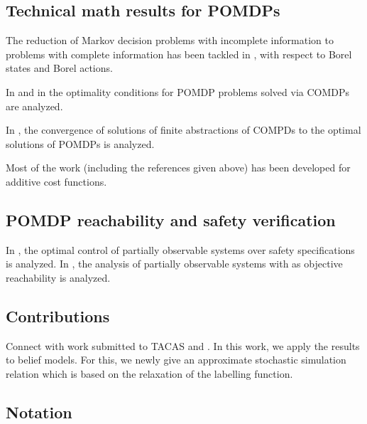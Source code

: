 \documentclass{ifacconf}
\newcommand{\red}[1]{{\color{red} #1}}
\begin{document}
\subsection{Technical math results for POMDPs}
The reduction of Markov decision problems with incomplete information to problems with complete information has been tackled in
\cite{yushkevich_reduction_1976,rhenius_incomplete_1974}, with respect to Borel states and Borel actions.

In \cite{feinberg2016partially} and in \cite{feinberg2014optimality} the optimality conditions for POMDP problems solved via COMDPs are analyzed. 

In \cite{saldi2017finite}, the convergence of solutions of finite abstractions of COMPDs to the optimal solutions of POMDPs is analyzed. 


Most of the work (including the references given above) has been developed for additive cost functions. 


\subsection{POMDP reachability and safety verification}


In \cite{ding2013optimal}, the optimal control of partially observable systems over safety specifications is analyzed. 
In \cite{LESSER20141989}, the analysis of partially observable systems with as objective reachability is analyzed. 

\subsection{Contributions}
\red{Connect with work submitted to TACAS \citep{tech_report_TACAS} and \citep{haesaert2017verification}.  }
In this work, we apply the results to belief models. For this,  we newly give an approximate stochastic simulation relation which is based on the relaxation of the labelling function.
\subsection{Notation}
\end{document}
